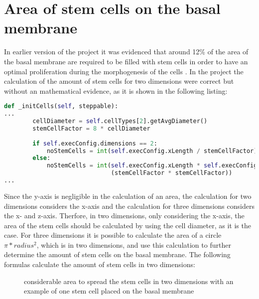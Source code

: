 \section{Area of stem cells on the basal membrane}
In earlier version of the project it was evidenced that around 12\% of the area of the basal membrane are required to be filled with stem cells in order to have an optimal proliferation during the morphogenesis of the cells \cite{Torelli2017}.
In the project the calculation of the amount of stem cells for two dimensions were correct but without an mathematical evidence, as it is shown in the following listing:
\begin{lstlisting}[language=Python, caption=calculation of the amount of stem cells on the basal membrane without a mathematical evidence]
    def _initCells(self, steppable):
...
        cellDiameter = self.cellTypes[2].getAvgDiameter()
        stemCellFactor = 8 * cellDiameter
       
        if self.execConfig.dimensions == 2:
            noStemCells = int(self.execConfig.xLength / stemCellFactor)
        else:
            noStemCells = int(self.execConfig.xLength * self.execConfig.yLength /
                              (stemCellFactor * stemCellFactor))
...
\end{lstlisting}
Since the y-axis is negligible in the calculation of an area, the calculation for two dimensions considers the x-axis and the calculation for three dimensions considers the x- and z-axis. Therfore, in two dimensions, only considering the x-axis, the area of the stem cells should be calculated by using the cell diameter, as it is the case. For three dimensions it is possible to calculate the area of a circle $\pi * radius^{2}$, which is in two dimensions, and use this calculation to further determine the amount of stem cells on the basal membrane. The following formulas calculate the amount of stem cells in two dimensions:

\begin{figure}
\begin{center}
\caption{considerable area to spread the stem cells in two dimensions with an example of one stem cell placed on the basal membrane}
\label{tikz:AreaIn2D}
\end{center}
\end{figure}


